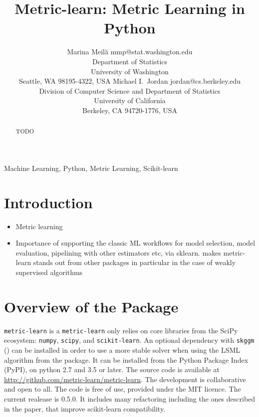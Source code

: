 \documentclass[twoside,11pt]{article}
\begin{document}
\title{Metric-learn: Metric Learning in Python}

\author{\name Marina Meil\u{a} \email mmp@stat.washington.edu \\
       \addr Department of Statistics\\
       University of Washington\\
       Seattle, WA 98195-4322, USA
       \AND
       \name Michael I.\ Jordan \email jordan@cs.berkeley.edu \\
       \addr Division of Computer Science and Department of Statistics\\
       University of California\\
       Berkeley, CA 94720-1776, USA}


\maketitle

\begin{abstract}%
TODO
\end{abstract}

\begin{keywords}
  Machine Learning, Python, Metric Learning, Scikit-learn
\end{keywords}

\section{Introduction}

\begin{itemize}
    \item Metric learning
    \item Importance of supporting the classic ML workflows for model selection, model evaluation, pipelining with other estimators etc, via sklearn. makes metric-learn stands out from other packages
    in particular in the case of weakly supervised algorithms
\end{itemize}


\section{Overview of the Package}
\texttt{metric-learn} is  a
\texttt{metric-learn} only relies on core libraries from the SciPy ecosystem: \texttt{numpy}, \texttt{scipy}, and \texttt{scikit-learn}. An optional dependency with \texttt{skggm} (\cite{skggm}) can be installed in order to use a more stable solver when using the LSML algorithm from the package.
It can be installed from the Python Package Index (PyPI), on python 2.7 and 3.5 or later.  The source code is available at \url{http://github.com/metric-learn/metric-learn}. The development is collaborative and open to all. The code is free of use, provided under the MIT licence. The current realease is 0.5.0. It includes many refactoring including the ones described in the paper, that improve scikit-learn compatibility.
\end{document}
